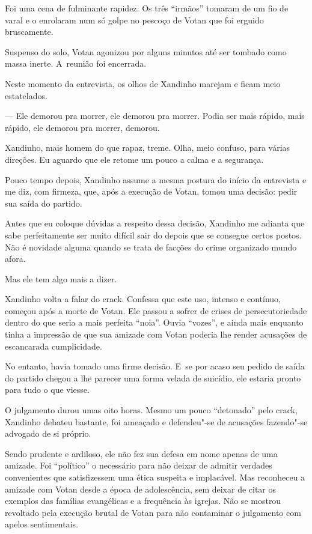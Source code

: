 Foi uma cena de fulminante rapidez. Os três ``irmãos'' tomaram de um fio
de varal e o enrolaram num só golpe no pescoço de Votan que foi erguido
bruscamente.

Suspenso do solo, Votan agonizou por alguns minutos até ser tombado como
massa inerte. A~reunião foi encerrada.

\asterisc{}

Neste momento da entrevista, os olhos de Xandinho marejam e ficam meio
estatelados.

— Ele demorou pra morrer, ele demorou pra morrer. Podia ser mais rápido,
mais rápido, ele demorou pra morrer, demorou.

Xandinho, mais homem do que rapaz, treme. Olha, meio confuso, para
várias direções. Eu aguardo que ele retome um pouco a calma e a
segurança.

Pouco tempo depois, Xandinho assume a mesma postura do início da
entrevista e me diz, com firmeza, que, após a execução de Votan, tomou
uma decisão: pedir sua saída do partido.

Antes que eu coloque dúvidas a respeito dessa decisão, Xandinho me
adianta que sabe perfeitamente ser muito difícil sair do  depois que
se consegue certos postos. Não é novidade alguma quando se trata de
facções do crime organizado mundo afora.

Mas ele tem algo mais a dizer.

\asterisc

Xandinho volta a falar do crack. Confessa que este uso, intenso e
contínuo, começou após a morte de Votan. Ele passou a sofrer de crises
de persecutoriedade dentro do que seria a mais perfeita ``noia''. Ouvia
``vozes'', e ainda mais enquanto tinha a impressão de que sua amizade
com Votan poderia lhe render acusações de escancarada cumplicidade.

No entanto, havia tomado uma firme decisão. E~se por acaso seu pedido de
saída do partido chegou a lhe parecer uma forma velada de suicídio, ele
estaria pronto para tudo o que viesse.

O julgamento durou umas oito horas. Mesmo um pouco ``detonado'' pelo
crack, Xandinho debateu bastante, foi ameaçado e defendeu"-se de
acusações fazendo"-se advogado de si próprio.

Sendo prudente e ardiloso, ele não fez sua defesa em nome apenas de uma
amizade. Foi ``político'' o necessário para não deixar de admitir
verdades convenientes que satisfizessem uma ética suspeita e implacável.
Mas reconheceu a amizade com Votan desde a época de adolescência, sem
deixar de citar os exemplos das famílias evangélicas e a frequência às
igrejas. Não se mostrou revoltado pela execução brutal de Votan para não
contaminar o julgamento com apelos sentimentais.

